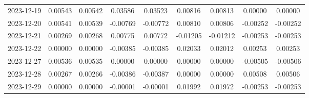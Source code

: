 \begin{footnotesize}
\begin{longtable}{lcccccccc}
2023-12-19 & 0.00543 & 0.00542 & 0.03586 & 0.03523 & 0.00816 & 0.00813 & 0.00000 & 0.00000 \\
2023-12-20 & 0.00541 & 0.00539 & -0.00769 & -0.00772 & 0.00810 & 0.00806 & -0.00252 & -0.00252 \\
2023-12-21 & 0.00269 & 0.00268 & 0.00775 & 0.00772 & -0.01205 & -0.01212 & -0.00253 & -0.00253 \\
2023-12-22 & 0.00000 & 0.00000 & -0.00385 & -0.00385 & 0.02033 & 0.02012 & 0.00253 & 0.00253 \\
2023-12-27 & 0.00536 & 0.00535 & 0.00000 & 0.00000 & 0.00000 & 0.00000 & -0.00505 & -0.00506 \\
2023-12-28 & 0.00267 & 0.00266 & -0.00386 & -0.00387 & 0.00000 & 0.00000 & 0.00508 & 0.00506 \\
2023-12-29 & 0.00000 & 0.00000 & -0.00001 & -0.00001 & 0.01992 & 0.01972 & -0.00253 & -0.00253 \\
\end{longtable}
\end{footnotesize}

